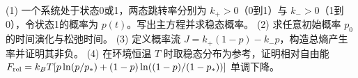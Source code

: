 (1) 一个系统处于状态0或1，两态跳转率分别为 \(k_+>0\)（0到1）与 \(k_->0\)（1到0），令状态1的概率为 \(p(t)\)。写出主方程并求稳态概率。
(2) 求任意初始概率 \(p_0\) 的时间演化与松弛时间。
(3) 定义概率流 \(J=k_+(1-p)-k_-p\)，构造总熵产生率并证明其非负。
(4) 在环境恒温 \(T\) 时取稳态分布为参考，证明相对自由能 \(F_{\rm rel}=k_BT[p\ln(p/p_*)+(1-p)\ln((1-p)/(1-p_*))]\) 单调下降。
